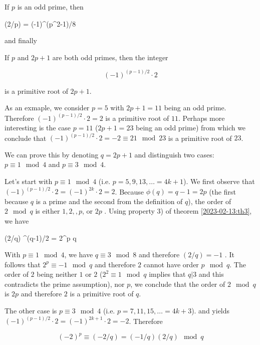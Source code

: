 \begin{theorem}
	If $p$ is an odd prime, then

	\bee
	(2/p) = (-1)^{(p^2-1)/8}
	\eee
\end{theorem}

and finally

\begin{theorem}
	If $p$ and $2p+1$ are both odd primes, then the integer

\begin{equation}
	(-1)^{(p-1)/2} \cdot 2
\end{equation}

is a primitive root of $2p+1$.

\end{theorem}

As an exmaple, we consider $p = 5$ with $2p+1=11$ being an odd prime. Therefore $(-1)^{(p-1)/2} \cdot 2 = 2$ is a primitive root of $11$. Perhaps more interesting is the case $p=11$ ($2p+1=23$ being an odd prime) from which we conclude that $(-1)^{(p-1)/2} \cdot 2 = -2 \equiv 21 \mod 23$ is a primitive root of $23$.

We can prove this by denoting $q=2p+1$ and distinguish two cases: $p \equiv 1 \mod 4$ and $p \equiv 3 \mod 4$. 

Let's start with $p \equiv 1 \mod 4$ (i.e. $p=5, 9, 13,\ldots = 4k+1$). We first observe that $(-1)^{(p-1)/2} \cdot 2 = (-1)^{2k} \cdot 2 = 2$. Because $\phi(q) = q-1 = 2p$ (the first because $q$ is a prime and the second from the definition of $q$), the order of $2 \mod q$ is either $1, 2, , p$, or $2p$ . Using property 3) of theorem \ref{2023-02-13:th3}, we have

\bee
(2/q) ^{(q-1)/2} = 2^p \mod q
\eee

With $p \equiv 1 \mod 4$, we have $q \equiv 3 \mod 8$ and therefore $(2/q) = -1$ . It follows that $2^p \equiv -1 \mod q$ and therefore $2$ cannot have order $p \mod q$. The order of $2$ being neither $1$ or $2$ ($2^2 \equiv 1 \mod q$ implies that $q |3$ and this contradicts the prime assumption), nor $p$, we conclude that the order of $2 \mod q$ is $2p$ and therefore $2$ is a primitive root of $q$.

The other case is $p \equiv 3 \mod 4$ (i.e. $p=7, 11, 15,\ldots = 4k+3$). and yields $(-1)^{(p-1)/2} \cdot 2 = (-1)^{2k+1} \cdot 2 = -2$. Therefore

\begin{equation}
	(-2)^p \equiv (-2/q) = (-1/q)(2/q) \mod q
\end{equation}

